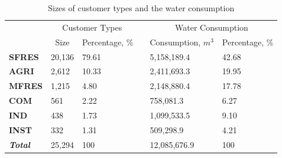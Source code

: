 \documentclass{sig-alternate}
\begin{document}
\begin{table}[htp]
\centering
\caption{Sizes of customer types and the water consumption}
\begin{tabular}{p{2cm}p{2cm}p{2cm}p{2cm}p{2cm}p{2cm}}
\hline
                        & \multicolumn{2}{c}{Customer Types}                            &                      & \multicolumn{2}{c}{Water Consumption}                                    \\ \cline{2-3} \cline{5-6} 
                        & \multicolumn{1}{c}{Size} & \multicolumn{1}{c}{Percentage, \%} & \multicolumn{1}{c}{} & \multicolumn{1}{c}{Consumption, $m^3$} & \multicolumn{1}{c}{Percentage, \%} \\ \hline
\textbf{SFRES}          & 20,136                   & 79.61                              &                      & 5,158,189.4                         & 42.68                              \\
\textbf{AGRI}           & 2,612                    & 10.33                              &                      & 2,411,693.3                         & 19.95                              \\
\textbf{MFRES}          & 1,215                    & 4.80                               &                      & 2,148,880.4                         & 17.78                              \\
\textbf{COM}            & 561                      & 2.22                               &                      & 758,081.3                           & 6.27                               \\
\textbf{IND}            & 438                      & 1.73                               &                      & 1,099,533.5                         & 9.10                               \\
\textbf{INST}           & 332                      & 1.31                               &                      & 509,298.9                           & 4.21                               \\ \hline
\textit{\textbf{Total}} & 25,294                   & 100                                &                      & 12,085,676.9                        & 100                                \\ \hline
\end{tabular}
\label{tab:custgroupandconsump}
\end{table}
\end{document}
